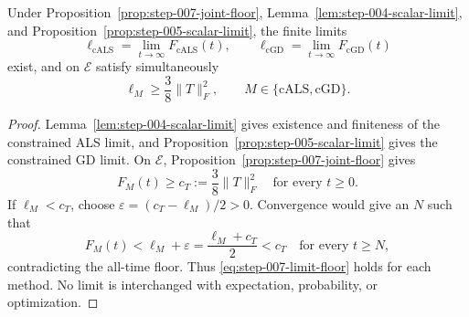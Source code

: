 \begin{proposition}\label{prop:step-007-limit-passage}
Under Proposition~\ref{prop:step-007-joint-floor},
Lemma~\ref{lem:step-004-scalar-limit}, and
Proposition~\ref{prop:step-005-scalar-limit}, the finite limits
\[
 \ell_{\mathrm{cALS}}=\lim_{t\to\infty}F_{\mathrm{cALS}}(t),
 \qquad
 \ell_{\mathrm{cGD}}=\lim_{t\to\infty}F_{\mathrm{cGD}}(t)
\]
exist, and on $\mathcal E$ satisfy simultaneously
\[
 \ell_M\ge\frac38\|T\|_F^2,
 \qquad M\in\{\mathrm{cALS},\mathrm{cGD}\}.
 \tag{A.18}\label{eq:step-007-limit-floor}
\]
\end{proposition}

\begin{proof}
Lemma~\ref{lem:step-004-scalar-limit} gives existence and finiteness of the
constrained ALS limit, and
Proposition~\ref{prop:step-005-scalar-limit} gives the constrained GD limit.
On $\mathcal E$, Proposition~\ref{prop:step-007-joint-floor} gives
\[
 F_M(t)\ge c_T:=\frac38\|T\|_F^2
 \quad\text{for every }t\ge0.
\]
If $\ell_M<c_T$, choose
$\varepsilon=(c_T-\ell_M)/2>0$.  Convergence would give an $N$ such that
\[
 F_M(t)<\ell_M+\varepsilon
 =\frac{\ell_M+c_T}{2}<c_T
 \quad\text{for every }t\ge N,
\]
contradicting the all-time floor.  Thus
\eqref{eq:step-007-limit-floor} holds for each method.  No limit is
interchanged with expectation, probability, or optimization.
\end{proof}

